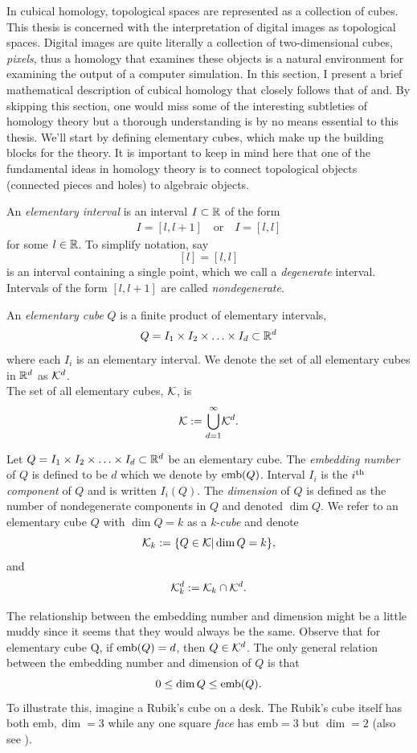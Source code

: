 In cubical homology, topological spaces are represented as a collection of cubes. This thesis is concerned with the interpretation of digital images as topological spaces. Digital images are quite literally a collection of two-dimensional cubes, \textit{pixels}, thus a homology that examines these objects is a natural environment for examining the output of a computer simulation. In this section, I present a brief mathematical description of cubical homology that closely follows that of and. By skipping this section, one would miss some of the interesting subtleties of homology theory but a thorough understanding is by no means essential to this thesis. We'll start by defining elementary cubes, which make up the building blocks for the theory. It is important to keep in mind here that one of the fundamental ideas in homology theory is to connect topological objects (\eg connected pieces and holes) to algebraic objects.

\begin{defn}
	An \textit{elementary interval} is an interval $I \subset \mathbb{R}$ of the form
	\begin{align*}
		I = [ l, l+1 ] \quad \text{or} \quad I = [l,l]
	\end{align*}
	for some $l \in \mathbb{R}$. To simplify notation, say $$[l] = [l, l]$$ is an interval containing a single point, which we call a \textit{degenerate} interval. Intervals of the form $[l, l+1]$ are called \textit{nondegenerate}.
\end{defn}

\begin{defn}
	An \textit{elementary cube} $Q$ is a finite product of elementary intervals, $$ Q = I_1 \times I_2 \times \ldots \times I_d \subset \mathbb{R}^d $$ where each $I_i$ is an elementary interval. We denote the set of all elementary cubes in $\mathbb{R}^d$ as $\mathcal{K}^{d}$. \\
	The set of all elementary cubes, $\mathcal{K}$, is
	$$ \mathcal{K} := { \bigcup_{d=1}^{\infty} } \mathcal{K}^{d} . $$
\end{defn}

\begin{defn}
	Let $Q = I_1 \times I_2 \times \ldots \times I_d \subset \mathbb{R}^d$ be an elementary cube. The \textit{embedding number} of $Q$ is defined to be $d$ which we denote by $\mathord{\mathrm{emb}(Q)}$. Interval $I_i$ is the $i\textsuperscript{th}$ \textit{component} of $Q$ and is written $\mathord{I_i(Q)}$. The \textit{dimension} of $Q$ is defined as the number of nondegenerate components in $Q$ and denoted $\dim{Q}$. We refer to an elementary cube $Q$ with $\dim{Q} = k$ as a \textit{k-cube} and denote
	$$ \mathcal{K}_k := \{ Q \in \mathcal{K} | \dim{Q} = k \},$$ and
	$$ \mathcal{K}_{k}^{d} := \mathcal{K}_k \cap \mathcal{K}^{d}. $$
\end{defn}
The relationship between the embedding number and dimension might be a little muddy since it seems that they would always be the same. Observe that for elementary cube {Q}, if $\mathord{\mathrm{emb}(Q)} = d$, then $Q \in \mathcal{K}^{d}$. The only general relation between the embedding number and dimension of $Q$ is that $$ 0 \leq \dim{Q} \leq \mathord{\mathrm{emb}(Q)} .$$ To illustrate this, imagine a Rubik's cube on a desk. The Rubik's cube itself has both $\text{emb}, \dim = 3$ while any one square \textit{face} has $\text{emb} = 3$ but $\dim = 2$ (also see ).

